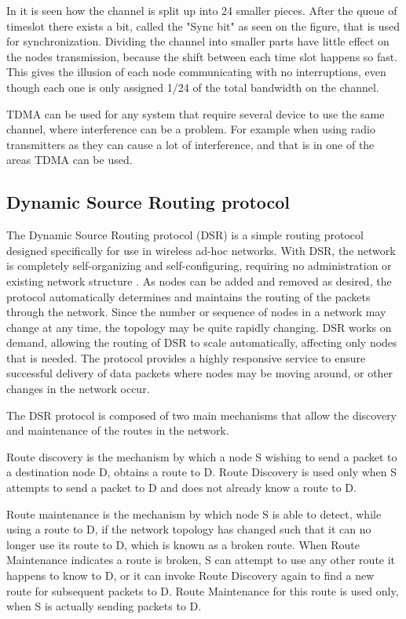 In  it is seen how the channel is split up into 24 smaller pieces. 
After the queue of timeslot there exists a bit, called the "Sync bit" as seen on the figure, that is used for synchronization.
Dividing the channel into smaller parts have little effect on the nodes transmission, because the shift between each time slot happens so fast.
This gives the illusion of each node communicating with no interruptions, even though each one is only assigned 1/24 of the total bandwidth on the channel.

TDMA can be used for any system that require several device to use the same channel, where interference can be a problem.
For example when using radio transmitters as they can cause a lot of interference, and that is in one of the areas TDMA can be used\cite{interferance_protocols}.


\subsection{Dynamic Source Routing protocol}
The Dynamic Source Routing protocol (DSR) is a simple routing protocol designed specifically for use in wireless ad-hoc networks.
With DSR, the network is completely self-organizing and self-configuring, requiring no administration or existing network structure \cite{DSR}. 
As nodes can be added and removed as desired, the protocol automatically determines and maintains the routing of the packets through the network.
Since the number or sequence of nodes in a network may change at any time, the topology may be quite rapidly changing.
DSR works on demand, allowing the routing of DSR to scale automatically, affecting only nodes that is needed.
The protocol provides a highly responsive service to ensure successful delivery of data packets where nodes may be moving around, or other changes in the network occur\cite{DSR}. 

The DSR protocol is composed of two main mechanisms that allow the discovery and maintenance of the routes in the network.

Route discovery is the mechanism by which a node S wishing to send a packet to a destination node D, obtains a route to D.
Route Discovery is used only when S attempts to send a packet to D and does not already know a route to D.

Route maintenance is the mechanism by which node S is able to detect, while using a route to D, if the network topology has changed such that it can no longer use its route to D, which is known as a broken route.
When Route Maintenance indicates a route is broken, S can attempt to use any other route it happens to know to D, or it can invoke Route Discovery again to find a new route for subsequent packets to D.
Route Maintenance for this route is used only, when S is actually sending packets to D.

